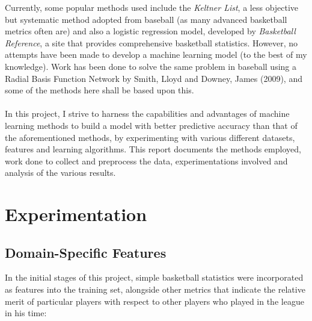 \documentclass[paper=a4, fontsize=11pt]{scrartcl} %
\numberwithin{equation}{section} %
\numberwithin{figure}{section} %
\numberwithin{table}{section} %
\begin{document}
Currently, some popular methods used include the \textit{Keltner List}, a less objective but systematic method adopted from baseball (as many advanced basketball metrics often are) and also a logistic regression model\cite{logregress}, developed by \textit{Basketball Reference}, a site that provides comprehensive basketball statistics. However, no attempts have been made to develop a machine learning model (to the best of my knowledge). Work has been done to solve the same problem in baseball using a Radial Basis Function Network by Smith, Lloyd and Downey, James (2009)\cite{lloyd}, and some of the methods here shall be based upon this.\\
\\
In this project, I strive to harness the capabilities and advantages of machine learning methods to build a model with better predictive accuracy than that of the aforementioned methods, by experimenting with various different datasets, features and learning algorithms. This report documents the methods employed, work done to collect and preprocess the data, experimentations involved and analysis of the various results.


\section{Experimentation}

\subsection{Domain-Specific Features}

In the initial stages of this project, simple basketball statistics were incorporated as features into the training set, alongside other metrics that indicate the relative merit of particular players with respect to other players who played in the league in his time: 
\end{document}
